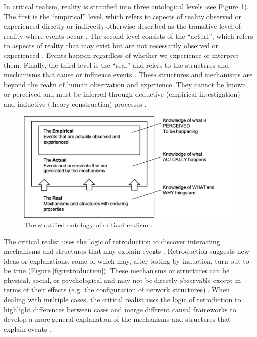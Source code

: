 In critical realism, reality is stratified into three ontological levels (see Figure \ref{fig:stratified_reality}). The first is the \enquote{empirical} level, which refers to aspects of reality observed or experienced directly or indirectly otherwise described as the transitive level of reality where events occur \citep{fletcher2017applying}. The second level consists of the \enquote{actual}, which refers to aspects of reality that may exist but are not necessarily observed or experienced \citep{mcevoy2006critical}. Events happen regardless of whether we experience or interpret them. Finally, the third level is the \enquote{real} and refers to the structures and mechanisms that cause or influence events \citep{zachariadis2013methodological}. These structures and mechanisms are beyond the realm of human observation and experience. They cannot be known or perceived and must be inferred through deductive (empirical investigation) and inductive (theory construction) processes \citep{mcevoy2006critical,wynn2012principles}. \medskip

\begin{figure}
\centering
\includegraphics[width=0.9\linewidth]{Images/stratified_reality.png}
\caption[The stratified ontology of critical realism]{The stratified ontology of critical realism \citep{bhaskar2013realist,mingers2006realising}.}
\label{fig:stratified_reality}
\end{figure}

The critical realist uses the logic of retroduction to discover interacting mechanisms and structures that may explain events \citep{sayer1999realism,wynn2012principles}. Retroduction suggests new ideas or explanations, some of which may, after testing by induction, turn out to be true (Figure \ref{fig:retroduction}). These mechanisms or structures can be physical, social, or psychological and may not be directly observable except in terms of their effects (e.g. the configuration of network structures) \citep{mcavoy2018critical}. When dealing with multiple cases, the critical realist uses the logic of retrodiction to highlight differences between cases and merge different causal frameworks to develop a more general explanation of the mechanisms and structures that explain events \citep{welch2011theorising,mcavoy2018critical}.

